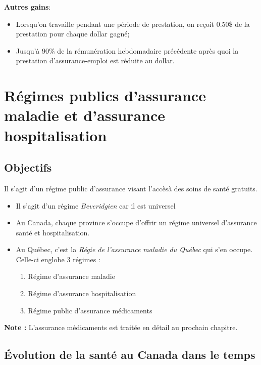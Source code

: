 \documentclass[10pt, french]{article}
\begin{document}
\begin{multicols*}{3}
\begin{definitionNOHFILLsub}[Fiscalité]
\textbf{Autres gains}:
\begin{itemize}[leftmargin = *]
	\item	Lorsqu'on travaille pendant une période de prestation, on reçoit 0.50\$ de la prestation pour chaque dollar gagné;
	\item	Jusqu'à 90\% de la rémunération hebdomadaire précédente après quoi la prestation d'assurance-emploi est réduite au dollar.
\end{itemize}
\end{definitionNOHFILLsub}



\newpage
\section{Régimes publics d'assurance maladie et d'assurance hospitalisation}
\subsection{Objectifs}
Il s'agit d'un régime public d'assurance visant l'accèsà des soins de santé gratuits.
\begin{itemize}
\item	Il s'agit d'un régime \textit{Beveridgien} car il est universel
\item	Au Canada, chaque province s'occupe d'offrir un régime universel d'assurance santé et hospitalisation.
\item 	Au Québec, c'est la \textit{Régie de l'assurance maladie du Québec} qui s'en occupe. Celle-ci englobe 3 régimes : 
	\begin{enumerate}
	\item	Régime d'assurance maladie
	\item	Régime d'assurance hospitalisation
	\item	Régime public d'assurance médicaments
	\end{enumerate}
\end{itemize}
\textbf{Note : } L'assurance médicaments est traitée en détail au prochain chapitre.


\subsection{Évolution de la santé au Canada dans le temps}

\end{multicols*}
\end{document}

